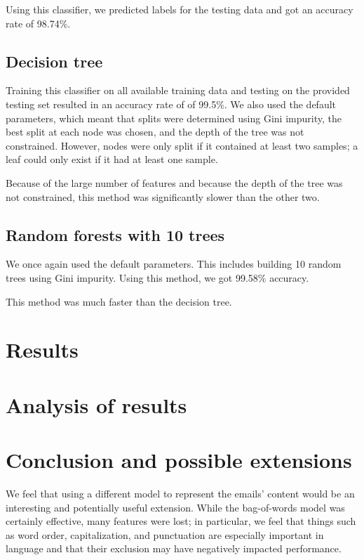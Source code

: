 \documentclass{article} %
\begin{document}
Using this classifier, we predicted labels for the testing data and got an accuracy rate of 98.74\%. 
\subsection{Decision tree}
Training this classifier on all available training data and testing on the provided testing set resulted in an accuracy rate of of 99.5\%. We also used the default parameters, which meant that splits were determined using Gini impurity, the best split at each node was chosen, and the depth of the tree was not constrained. However, nodes were only split if it contained at least two samples; a leaf could only exist if it had at least one sample. 

Because of the large number of features and because the depth of the tree was not constrained, this method was significantly slower than the other two.
\subsection{Random forests with 10 trees}
We once again used the default parameters. This includes building 10 random trees using Gini impurity.
Using this method, we got 99.58\% accuracy. 

This method was much faster than the decision tree.

\section{Results}

\section{Analysis of results}

\section{Conclusion and possible extensions}

We feel that using a different model to represent the emails' content would be an interesting and potentially useful extension. While the bag-of-words model was certainly effective, many features were lost; in particular, we feel that things such as word order, capitalization, and punctuation are especially important in language and that their exclusion may have negatively impacted performance. 
\end{document}
